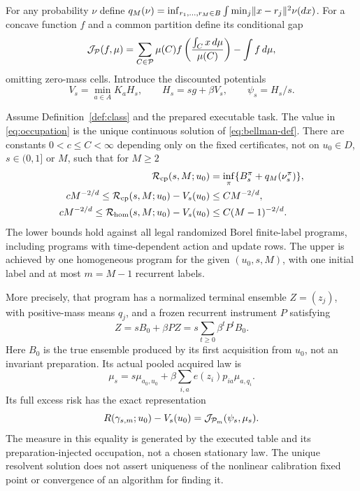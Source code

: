 For any probability $\nu$ define $q_M(\nu)=\inf_{r_1,\ldots,r_M\in B}\int\min_j\lVert x-r_j\rVert^2\nu(dx)$. For a concave function $f$ and a common partition define its conditional gap
\begin{equation}\label{eq:jensen}
 \mathcal J_{\mathcal P}(f,\mu)
 =\sum_{C\in\mathcal P}\mu(C)f\left(\frac{\int_Cx\,d\mu}{\mu(C)}\right)-\int f\,d\mu,
\end{equation}
omitting zero-mass cells. Introduce the discounted potentials
\begin{equation}\label{eq:bellman-def}
 V_s=\min_{a\in A}K_aH_s,\qquad H_s=s g+\beta V_s,
 \qquad \psi_s=H_s/s.
\end{equation}

\begin{theorem}\label{thm:main}
Assume Definition~\ref{def:class} and the prepared executable task. The value in \eqref{eq:occupation} is the unique continuous solution of \eqref{eq:bellman-def}. There are constants $0<c\le C<\infty$ depending only on the fixed certificates, not on $u_0\in D$, $s\in(0,1]$ or $M$, such that for $M\ge2$
\begin{align}
 \mathcal R_{\rm cp}(s,M;u_0)
 &=\inf_\pi\{B_s^\pi+q_M(\nu_s^\pi)\},\label{eq:cp-exact}\\
 cM^{-2/d}\le\mathcal R_{\rm cp}(s,M;u_0)-V_s(u_0)
 &\le CM^{-2/d},\label{eq:cp-law}\\
 cM^{-2/d}\le\mathcal R_{\rm hom}(s,M;u_0)-V_s(u_0)
 &\le C(M-1)^{-2/d}.\label{eq:hom-law}
\end{align}
The lower bounds hold against all legal randomized Borel finite-label programs, including programs with time-dependent action and update rows. The upper is achieved by one homogeneous program for the given $(u_0,s,M)$, with one initial label and at most $m=M-1$ recurrent labels.

More precisely, that program has a normalized terminal ensemble $Z=(z_j)$, with positive-mass means $q_j$, and a frozen recurrent instrument $P$ satisfying
\begin{equation}\label{eq:resolvent}
 Z=sB_0+\beta PZ
   =s\sum_{t\ge0}\beta^tP^tB_0.
\end{equation}
Here $B_0$ is the true ensemble produced by its first acquisition from $u_0$, not an invariant preparation. Its actual pooled acquired law is
\begin{equation}\label{eq:actual-pooled}
 \mu_s=s\mu_{a_0,u_0}
       +\beta\sum_{i,a}e(z_i)p_{ia}\mu_{a,q_i}.
\end{equation}
Its full excess risk has the exact representation
\begin{equation}\label{eq:exact-gap}
 R(\gamma_{s,m};u_0)-V_s(u_0)
       =\mathcal J_{\mathcal P_m}(\psi_s,\mu_s).
\end{equation}
The measure in this equality is generated by the executed table and its preparation-injected occupation, not a chosen stationary law. The unique resolvent solution does not assert uniqueness of the nonlinear calibration fixed point or convergence of an algorithm for finding it.
\end{theorem}

